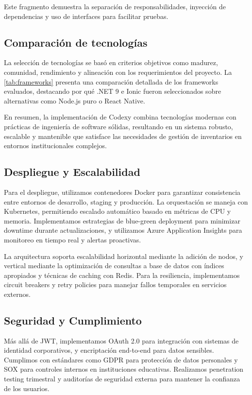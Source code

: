 Este fragmento demuestra la separación de responsabilidades, inyección de dependencias y uso de interfaces para facilitar pruebas.

\subsection{Comparación de tecnologías}

La selección de tecnologías se basó en criterios objetivos como madurez, comunidad, rendimiento y alineación con los requerimientos del proyecto. La \cref{tab:frameworks} presenta una comparación detallada de los frameworks evaluados, destacando por qué .NET 9 e Ionic fueron seleccionados sobre alternativas como Node.js puro o React Native.



En resumen, la implementación de Codexy combina tecnologías modernas con prácticas de ingeniería de software sólidas, resultando en un sistema robusto, escalable y mantenible que satisface las necesidades de gestión de inventarios en entornos institucionales complejos.

\subsection{Despliegue y Escalabilidad}

Para el despliegue, utilizamos contenedores Docker para garantizar consistencia entre entornos de desarrollo, staging y producción. La orquestación se maneja con Kubernetes, permitiendo escalado automático basado en métricas de CPU y memoria. Implementamos estrategias de blue-green deployment para minimizar downtime durante actualizaciones, y utilizamos Azure Application Insights para monitoreo en tiempo real y alertas proactivas.

La arquitectura soporta escalabilidad horizontal mediante la adición de nodos, y vertical mediante la optimización de consultas a base de datos con índices apropiados y técnicas de caching con Redis. Para la resiliencia, implementamos circuit breakers y retry policies para manejar fallos temporales en servicios externos.

\subsection{Seguridad y Cumplimiento}

Más allá de JWT, implementamos OAuth 2.0 para integración con sistemas de identidad corporativos, y encriptación end-to-end para datos sensibles. Cumplimos con estándares como GDPR para protección de datos personales y SOX para controles internos en instituciones educativas. Realizamos penetration testing trimestral y auditorías de seguridad externa para mantener la confianza de los usuarios.